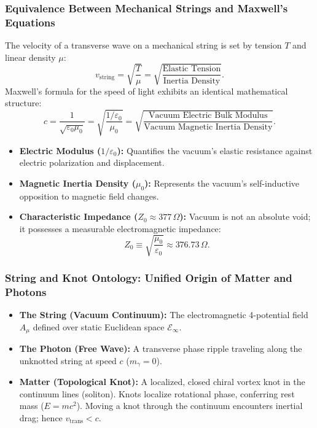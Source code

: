 \subsubsection{Equivalence Between Mechanical Strings and Maxwell's Equations}
The velocity of a transverse wave on a mechanical string is set by tension $T$ and linear density $\mu$:
\begin{equation}
    v_{\mathrm{string}} = \sqrt{\frac{T}{\mu}} = \sqrt{\frac{\text{Elastic Tension}}{\text{Inertia Density}}}.
    \label{eq:mekanik_tel_hizi}
\end{equation}
Maxwell's formula for the speed of light exhibits an identical mathematical structure:
\begin{equation}
    c = \frac{1}{\sqrt{\varepsilon_0 \mu_0}} = \sqrt{\frac{1/\varepsilon_0}{\mu_0}} = \sqrt{\frac{\text{Vacuum Electric Bulk Modulus}}{\text{Vacuum Magnetic Inertia Density}}}.
    \label{eq:vakum_tel_ozdeslik}
\end{equation}
\begin{itemize}
    \item \textbf{Electric Modulus ($1/\varepsilon_0$):} Quantifies the vacuum's elastic resistance against electric polarization and displacement.
    \item \textbf{Magnetic Inertia Density ($\mu_0$):} Represents the vacuum's self-inductive opposition to magnetic field changes.
    \item \textbf{Characteristic Impedance ($Z_0 \approx 377\,\Omega$):} Vacuum is not an absolute void; it possesses a measurable electromagnetic impedance:
          \begin{equation}
              Z_0 \equiv \sqrt{\frac{\mu_0}{\varepsilon_0}} \approx 376.73\,\Omega.
              \label{eq:vakum_empedansi_tanim}
          \end{equation}
\end{itemize}

\subsubsection{String and Knot Ontology: Unified Origin of Matter and Photons}
\begin{itemize}
    \item \textbf{The String (Vacuum Continuum):} The electromagnetic 4-potential field $A_\mu$ defined over static Euclidean space $\mathcal{E}_\infty$.
    \item \textbf{The Photon (Free Wave):} A transverse phase ripple traveling along the unknotted string at speed $c$ ($m_\gamma = 0$).
    \item \textbf{Matter (Topological Knot):} A localized, closed chiral vortex knot in the continuum lines (soliton). Knots localize rotational phase, conferring rest mass ($E=mc^2$). Moving a knot through the continuum encounters inertial drag; hence $v_{\mathrm{trans}} < c$.
\end{itemize}

